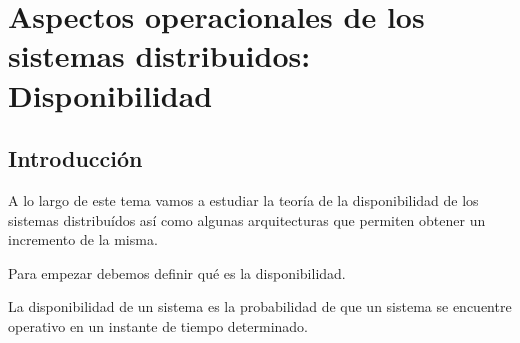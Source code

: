 \documentclass{apuntes}[nochap]
\begin{document}
\chapter{Aspectos operacionales de los sistemas distribuidos: Disponibilidad}
\section{Introducción}
A lo largo de este tema vamos a estudiar la teoría de la disponibilidad de los sistemas distribuídos así como algunas arquitecturas que permiten obtener un incremento de la misma.

Para empezar debemos definir qué es la disponibilidad.

\begin{defn}[Disponibilidad]
La disponibilidad de un sistema es la probabilidad de que un sistema se encuentre operativo en un instante de tiempo determinado.
\end{defn}
\end{document}
